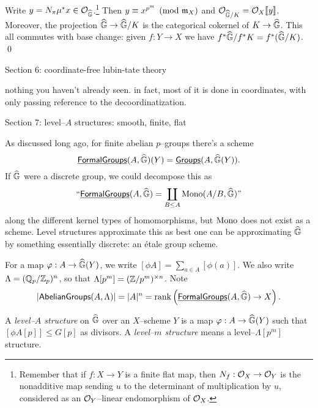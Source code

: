 \begin{lemma}
Write $y = N_\pi \mu^* x \in \mathcal{O}_{\widehat{\mathbb G}}$.\footnote{Remember that if $f: X \to Y$ is a finite flat map, then $N_f: \mathcal{O}_X \to \mathcal{O}_Y$ is the nonadditive map sending $u$ to the determinant of multiplication by $u$, considered as an $\mathcal{O}_Y$--linear endomorphism of $\mathcal{O}_X$.}  Then $y \equiv x^{p^m} \pmod{\mathfrak m_X}$ and $\mathcal{O}_{\widehat{\mathbb G}/K} = \mathcal{O}_X\llbracket{y}\rrbracket$.  Moreover, the projection $\widehat{\mathbb G} \to \widehat{\mathbb G}/K$ is the categorical cokernel of $K \to \widehat{\mathbb G}$.  This all commutes with base change: given $f: Y \to X$ we have $f^* \widehat{\mathbb G} / f^* K = f^*(\widehat{\mathbb G}/K)$. \qed {}
\end{lemma}


Section 6: coordinate-free lubin-tate theory

nothing you haven't already seen. in fact, most of it is done in coordinates, with only passing reference to the decoordinatization.

Section 7: level--$A$ structures: smooth, finite, flat

As discussed long ago, for finite abelian $p$--groups there's a scheme \[\operatorname{\underline{\smash{\mathsf{FormalGroups}}}}(A, \widehat{\mathbb G})(Y) = \operatorname{\underline{\smash{\mathsf{Groups}}}}(A, \widehat{\mathbb G}(Y)).\]  If $\widehat{\mathbb G}$ were a discrete group, we could decompose this as \[\text{``$\operatorname{\underline{\smash{\mathsf{FormalGroups}}}}(A, \widehat{\mathbb G}) = \coprod_{B \le A} \operatorname{Mono}(A/B, \widehat{\mathbb G})$''}\] along the different kernel types of homomorphisms, but $\operatorname{Mono}$ does not exist as a scheme.  Level structures approximate this as best one can be approximating $\widehat{\mathbb G}$ by something essentially discrete: an \'etale group scheme.

For a map $\varphi: A \to \widehat{\mathbb G}(Y)$, we write $[\phi A] = \sum_{a \in A}[\phi(a)]$.  We also write $\Lambda = (\mathbb{Q}_p / \mathbb Z_p)^n$, so that $\Lambda[p^m] = (\mathbb Z/p^m)^{\times n}$.  Note \[|\mathsf{AbelianGroups}(A, \Lambda)| = |A|^n = \operatorname{rank} \left( \operatorname{\underline{\smash{\mathsf{FormalGroups}}}}(A, \widehat{\mathbb G}) \to X \right).\]

\begin{definition}
A \textit{level--$A$ structure} on $\widehat{\mathbb G}$ over an $X$--scheme $Y$ is a map $\varphi: A \to \widehat{\mathbb G}(Y)$ such that $[\phi A[p]] \le G[p]$ as divisors.  A \textit{level--$m$ structure} means a level--$\Lambda[p^m]$ structure.
\end{definition}

